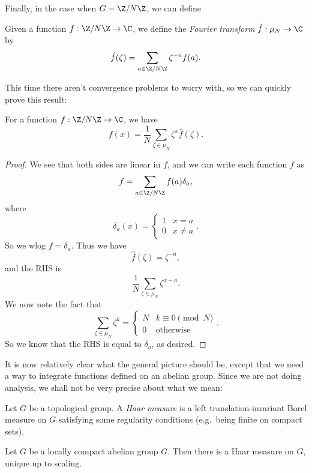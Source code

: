 \documentclass[a4paper]{article}
\begin{document}
Finally, in the case when $G = \Z/N\Z$, we can define
\begin{defi}
  Given a function $f: \Z/N\Z \to \C$, we define the \emph{Fourier transform} $\hat{f}: \mu_N \to \C$ by
  \[
    \hat{f}(\zeta) = \sum_{a \in \Z/N\Z} \zeta^{-a} f(a).
  \]
\end{defi}

This time there aren't convergence problems to worry with, so we can quickly prove this result:
\begin{prop}
  For a function $f: \Z/N\Z \to \C$, we have
  \[
    f(x) = \frac{1}{N} \sum_{\zeta \in \mu_N} \zeta^x \hat{f}(\zeta).
  \]
\end{prop}

\begin{proof}
  We see that both sides are linear in $f$, and we can write each function $f$ as
  \[
    f = \sum_{a \in \Z/N\Z} f(a) \delta_a,
  \]
  where
  \[
    \delta_a(x) =
    \begin{cases}
      1 & x = a\\
      0 & x \not= a
    \end{cases}.
  \]
  So we wlog $f = \delta_a$. Thus we have
  \[
    \hat{f}(\zeta) = \zeta^{-a},
  \]
  and the RHS is
  \[
    \frac{1}{N} \sum_{\zeta \in \mu_N} \zeta^{x - a}.
  \]
  We now note the fact that
  \[
    \sum_{\zeta \in \mu_N} \zeta^k =
    \begin{cases}
      N & k \equiv 0 \pmod N\\
      0 & \text{otherwise}
    \end{cases}.
  \]
  So we know that the RHS is equal to $\delta_a$, as desired.
\end{proof}

It is now relatively clear what the general picture should be, except that we need a way to integrate functions defined on an abelian group. Since we are not doing analysis, we shall not be very precise about what we mean:

\begin{defi}
  Let $G$ be a topological group. A \emph{Haar measure} is a left translation-invariant Borel measure on $G$ satisfying some regularity conditions (e.g.\ being finite on compact sets).
\end{defi}

\begin{thm}
  Let $G$ be a locally compact abelian group $G$. Then there is a Haar measure on $G$, unique up to scaling.
\end{thm}
\end{document}
